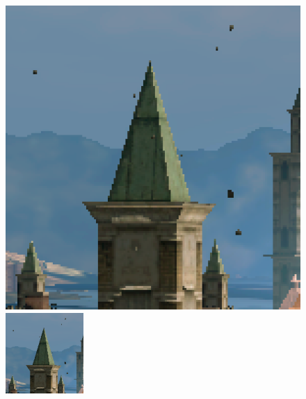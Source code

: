 \begin{enumerate}
\begin{figure}[H]
\begin{minipage}{0.5\textwidth}
  \includegraphics[width=0.95\linewidth]{src/test3.png}
\end{minipage}%
\begin{minipage}{0.5\textwidth}
  \includegraphics[width=0.95\linewidth]{src/ans3.png}
\end{minipage}
\end{figure}

\end{enumerate}

